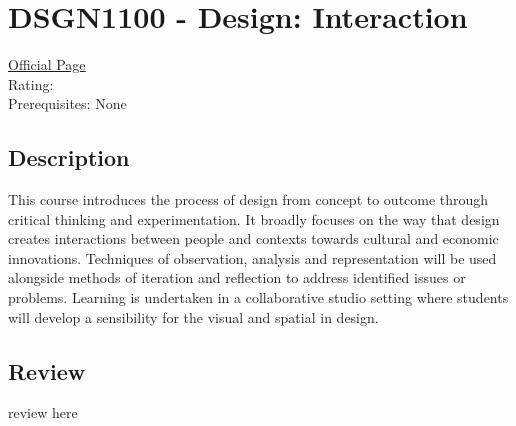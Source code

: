 \hypertarget{DSGN1100}{\section{DSGN1100 - Design: Interaction}}

\large
\textcolor{turbo_purple}{\href{https://my.uq.edu.au/programs-courses/course.html?course_code=DSGN1100}{Official Page}} \\
Rating: \cstar\cstar\cstar\cstar\ostar \\
Prerequisites: None

\normalsize
\subsection*{Description}
This course introduces the process of design from concept to outcome through critical thinking and experimentation.
It broadly focuses on the way that design creates interactions between people and contexts towards cultural and economic innovations.
Techniques of observation, analysis and representation will be used alongside methods of iteration and reflection to address identified issues or problems.
Learning is undertaken in a collaborative studio setting where students will develop a sensibility for the visual and spatial in design.

\subsection*{Review}
review here
